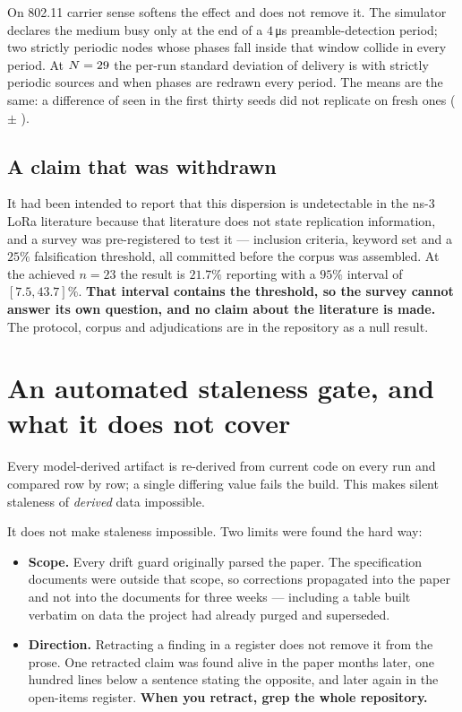 On 802.11 carrier sense softens the effect and does not remove it. The simulator declares the
medium busy only at the end of a $4$\,\si{\micro\second} preamble-detection period; two
strictly periodic nodes whose phases fall inside that window collide in every period. At
$N = 29$ the per-run standard deviation of delivery is \phaseSdFrozen{} with strictly
periodic sources and \phaseSdRedrawn{} when phases are redrawn every period. The means are the
same: a difference of \srcMeanDiff{} seen in the first thirty seeds did not replicate on fresh
ones (\srcFreshD{} $\pm$ \srcFreshSe).

\subsection{A claim that was withdrawn}\label{sec:survey-null}

It had been intended to report that this dispersion is undetectable in the ns-3 LoRa literature
because that literature does not state replication information, and a survey was pre-registered
to test it --- inclusion criteria, keyword set and a $25\%$ falsification threshold, all committed
before the corpus was assembled. At the achieved $n{=}23$ the result is $21.7\%$ reporting with a
$95\%$ interval of $[7.5, 43.7]\%$. \textbf{That interval contains the threshold, so the survey
cannot answer its own question, and no claim about the literature is made.} The protocol, corpus
and adjudications are in the repository as a null result.

\section{An automated staleness gate, and what it does not cover}

Every model-derived artifact is re-derived from current code on every run and compared row by row;
a single differing value fails the build. This makes silent staleness of \emph{derived} data
impossible.

It does not make staleness impossible. Two limits were found the hard way:

\begin{itemize}
\item \textbf{Scope.} Every drift guard originally parsed the paper. The specification documents
were outside that scope, so corrections propagated into the paper and not into the documents for
three weeks --- including a table built verbatim on data the project had already purged and
superseded.
\item \textbf{Direction.} Retracting a finding in a register does not remove it from the prose. One
retracted claim was found alive in the paper months later, one hundred lines below a sentence
stating the opposite, and later again in the open-items register. \textbf{When you retract, grep the
whole repository.}
\end{itemize}

